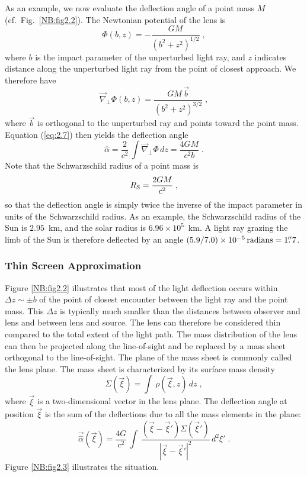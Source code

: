 \documentclass[a4paper,10pt]{article} %
\newcommand{\farcs}{\hbox{$.\!\!^{\prime\prime}$}}
\begin{document}
As an example, we now evaluate the deflection angle of a point mass
$M$ (cf.\ Fig.\ \ref{NB:fig2.2}). The Newtonian potential of the lens
is
\begin{equation}
  \Phi(b,z) = -\frac{GM}{(b^2+z^2)^{1/2}}\;,
\label{eq:2.6}
\end{equation}
where $b$ is the impact parameter of the unperturbed light ray, and
$z$ indicates distance along the unperturbed light ray from the point
of closest approach. We therefore have
\begin{equation}
  \vec\nabla_\perp\Phi(b,z) = \frac{GM\,\vec b}{(b^2+z^2)^{3/2}}\;,
\label{eq:2.7}
\end{equation}
where $\vec b$ is orthogonal to the unperturbed ray and points toward
the point mass. Equation (\ref{eq:2.7}) then yields the deflection
angle
\begin{equation}
  \hat\alpha = \frac{2}{c^2}\,
  \int\vec\nabla_\perp\Phi\,dz
  = \frac{4GM}{c^2b}\;.
\label{eq:2.8}
\end{equation}
Note that the Schwarzschild radius of a point mass is
\begin{equation}
  R_{\rm S} = \frac{2GM}{c^2}\;,
\label{eq:2.9}
\end{equation}
so that the deflection angle is simply twice the inverse of the impact
parameter in units of the Schwarzschild radius. As an example, the
Schwarzschild radius of the Sun is $2.95$~km, and the solar radius is
$6.96\times10^5$~km. A light ray grazing the limb of the Sun is
therefore deflected by an angle
$(5.9/7.0)\times10^{-5}\,\hbox{radians}=1\farcs7$.

\subsubsection{Thin Screen Approximation}
\label{NB:subsubsect2.1.2}

Figure \ref{NB:fig2.2} illustrates that most of the light deflection
occurs within $\Delta z\sim\pm b$ of the point of closest encounter
between the light ray and the point mass. This $\Delta z$ is typically
much smaller than the distances between observer and lens and between
lens and source. The lens can therefore be considered thin compared to
the total extent of the light path. The mass distribution of the lens
can then be projected along the line-of-sight and be replaced by a
mass sheet orthogonal to the line-of-sight. The plane of the mass
sheet is commonly called the lens plane. The mass sheet is
characterized by its surface mass density
\begin{equation}
  \Sigma(\vec\xi) = \int\,\rho(\vec\xi,z)\,dz\;,
\label{eq:2.10}
\end{equation}
where $\vec\xi$ is a two-dimensional vector in the lens plane. The
deflection angle at position $\vec\xi$ is the sum of the deflections
due to all the mass elements in the plane:
\begin{equation}
  \vec{\hat\alpha}(\vec\xi) = \frac{4G}{c^2}\,\int\,
  \frac{(\vec\xi-\vec\xi')\Sigma(\vec\xi')}{|\vec\xi-\vec\xi'|^2}
  \,d^2\xi'\;.
\label{eq:2.11}
\end{equation}
Figure \ref{NB:fig2.3} illustrates the situation.
\end{document}
